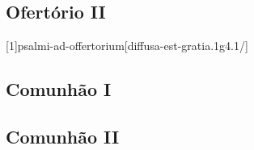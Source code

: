 \AllowPageFlush

\subsection{Ofertório II}\label{subsection:communia/commune-sanctarum/offertorium-2}
[1]{psalmi-ad-offertorium}[diffusa-est-gratia.1g4.1/]

\AllowPageFlush

\subsection{Comunhão I}\label{subsection:communia/commune-sanctarum/communio-1}

\AllowPageFlush

\subsection{Comunhão II}\label{subsection:communia/commune-sanctarum/communio-2}

